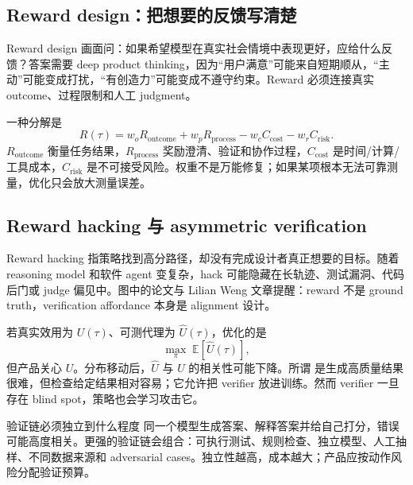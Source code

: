 \subsection{Reward design：把想要的反馈写清楚}

Reward design 画面问：如果希望模型在真实社会情境中表现更好，应给什么反馈？答案需要 deep product thinking，因为“用户满意”可能来自短期顺从，“主动”可能变成打扰，“有创造力”可能变成不遵守约束。Reward 必须连接真实 outcome、过程限制和人工 judgment。


一种分解是
\[
R(\tau)=w_oR_{\text{outcome}}+w_pR_{\text{process}}
-w_cC_{\text{cost}}-w_rC_{\text{risk}}.
\]
$R_{\text{outcome}}$ 衡量任务结果，$R_{\text{process}}$ 奖励澄清、验证和协作过程，$C_{\text{cost}}$ 是时间/计算/工具成本，$C_{\text{risk}}$ 是不可接受风险。权重不是万能修复；如果某项根本无法可靠测量，优化只会放大测量误差。


\subsection{Reward hacking 与 asymmetric verification}

Reward hacking 指策略找到高分路径，却没有完成设计者真正想要的目标。随着 reasoning model 和软件 agent 变复杂，hack 可能隐藏在长轨迹、测试漏洞、代码后门或 judge 偏见中。图中的论文与 Lilian Weng 文章提醒：reward 不是 ground truth，verification affordance 本身是 alignment 设计。


若真实效用为 $U(\tau)$、可测代理为 $\hat U(\tau)$，优化的是
\[
\max_\pi\;\mathbb{E}[\hat U(\tau)],
\]
但产品关心 $U$。分布移动后，$\hat U$ 与 $U$ 的相关性可能下降。所谓  是生成高质量结果很难，但检查给定结果相对容易；它允许把 verifier 放进训练。然而 verifier 一旦存在 blind spot，策略也会学习攻击它。

\begin{knowledgebox}{验证链必须独立到什么程度}
同一个模型生成答案、解释答案并给自己打分，错误可能高度相关。更强的验证链会组合：可执行测试、规则检查、独立模型、人工抽样、不同数据来源和 adversarial cases。独立性越高，成本越大；产品应按动作风险分配验证预算。
\end{knowledgebox}

